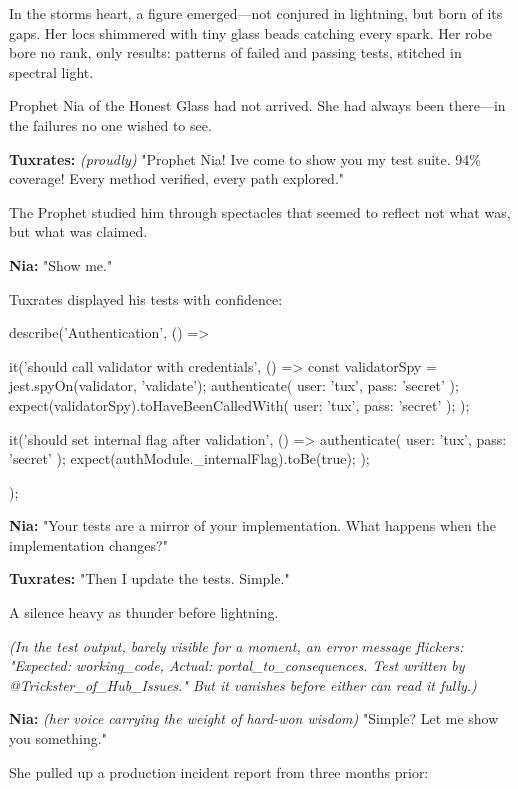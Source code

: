 In the storm\textquotesingle s heart, a figure emerged---not conjured in lightning, but born of its gaps. Her locs shimmered with tiny glass beads catching every spark. Her robe bore no rank, only results: patterns of failed and passing tests, stitched in spectral light.

Prophet Nia of the Honest Glass had not arrived. She had always been there---in the failures no one wished to see.

\textbf{Tuxrates:} \emph{(proudly)} "Prophet Nia! I\textquotesingle ve come to show you my test suite. 94\% coverage! Every method verified, every path explored."

The Prophet studied him through spectacles that seemed to reflect not what was, but what was claimed.

\textbf{Nia:} "Show me."

Tuxrates displayed his tests with confidence:

\begin{codeblock}
describe('Authentication', () => {
  it('should call validator with credentials', () => {
    const validatorSpy = jest.spyOn(validator, 'validate');
    authenticate({ user: 'tux', pass: 'secret' });
    expect(validatorSpy).toHaveBeenCalledWith({ user: 'tux', pass: 'secret' });
  });
  
  it('should set internal flag after validation', () => {
    authenticate({ user: 'tux', pass: 'secret' });
    expect(authModule._internalFlag).toBe(true);
  });
});
\end{codeblock}

\textbf{Nia:} "Your tests are a mirror of your implementation. What happens when the implementation changes?"

\textbf{Tuxrates:} "Then I update the tests. Simple."

A silence heavy as thunder before lightning.

\emph{(In the test output, barely visible for a moment, an error message flickers: "Expected: working\_code, Actual: portal\_to\_consequences. Test written by @Trickster\_of\_Hub\_Issues." But it vanishes before either can read it fully.)}

\textbf{Nia:} \emph{(her voice carrying the weight of hard-won wisdom)} "Simple? Let me show you something."

She pulled up a production incident report from three months prior:



